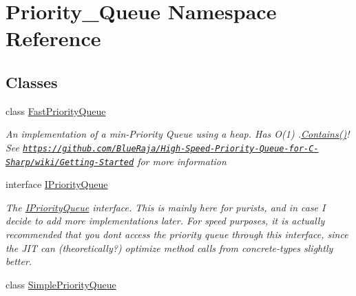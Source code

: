 \hypertarget{namespace_priority___queue}{}\section{Priority\+\_\+\+Queue Namespace Reference}
\label{namespace_priority___queue}
\subsection*{Classes}
\begin{DoxyCompactItemize}
\item 
class \hyperlink{class_priority___queue_1_1_fast_priority_queue}{Fast\+Priority\+Queue}
\begin{DoxyCompactList}\small\item\em An implementation of a min-\/\+Priority Queue using a heap. Has O(1) .\hyperlink{class_priority___queue_1_1_fast_priority_queue_ac7ed1c55afc22b9f492576675d0651c7}{Contains()}! See \href{https://github.com/BlueRaja/High-Speed-Priority-Queue-for-C-Sharp/wiki/Getting-Started}{\tt https\+://github.\+com/\+Blue\+Raja/\+High-\/\+Speed-\/\+Priority-\/\+Queue-\/for-\/\+C-\/\+Sharp/wiki/\+Getting-\/\+Started} for more information \end{DoxyCompactList}\item 
interface \hyperlink{interface_priority___queue_1_1_i_priority_queue}{I\+Priority\+Queue}
\begin{DoxyCompactList}\small\item\em The \hyperlink{interface_priority___queue_1_1_i_priority_queue}{I\+Priority\+Queue} interface. This is mainly here for purists, and in case I decide to add more implementations later. For speed purposes, it is actually recommended that you {\itshape don\textquotesingle{}t} access the priority queue through this interface, since the J\+IT can (theoretically?) optimize method calls from concrete-\/types slightly better. \end{DoxyCompactList}\item 
class \hyperlink{class_priority___queue_1_1_simple_priority_queue}{Simple\+Priority\+Queue}
\end{DoxyCompactItemize}
